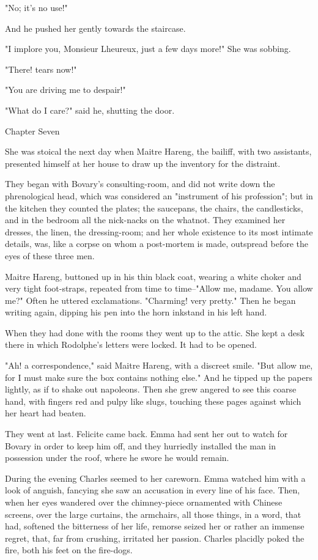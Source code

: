 \documentclass[11pt,twocolumn]{ltugboat}
\begin{document}
"No; it's no use!"

And he pushed her gently towards the staircase.

"I implore you, Monsieur Lheureux, just a few days more!" She was
sobbing.

"There! tears now!"

"You are driving me to despair!"

"What do I care?" said he, shutting the door.



Chapter Seven

She was stoical the next day when Maitre Hareng, the bailiff, with two
assistants, presented himself at her house to draw up the inventory for
the distraint.

They began with Bovary's consulting-room, and did not write down
the phrenological head, which was considered an "instrument of his
profession"; but in the kitchen they counted the plates; the saucepans,
the chairs, the candlesticks, and in the bedroom all the nick-nacks on
the whatnot. They examined her dresses, the linen, the dressing-room;
and her whole existence to its most intimate details, was, like a corpse
on whom a post-mortem is made, outspread before the eyes of these three
men.

Maitre Hareng, buttoned up in his thin black coat, wearing a white
choker and very tight foot-straps, repeated from time to time--"Allow
me, madame. You allow me?" Often he uttered exclamations. "Charming!
very pretty." Then he began writing again, dipping his pen into the horn
inkstand in his left hand.

When they had done with the rooms they went up to the attic. She kept a
desk there in which Rodolphe's letters were locked. It had to be opened.

"Ah! a correspondence," said Maitre Hareng, with a discreet smile. "But
allow me, for I must make sure the box contains nothing else." And he
tipped up the papers lightly, as if to shake out napoleons. Then she
grew angered to see this coarse hand, with fingers red and pulpy like
slugs, touching these pages against which her heart had beaten.

They went at last. Felicite came back. Emma had sent her out to watch
for Bovary in order to keep him off, and they hurriedly installed the
man in possession under the roof, where he swore he would remain.

During the evening Charles seemed to her careworn. Emma watched him with
a look of anguish, fancying she saw an accusation in every line of his
face. Then, when her eyes wandered over the chimney-piece ornamented
with Chinese screens, over the large curtains, the armchairs, all
those things, in a word, that had, softened the bitterness of her life,
remorse seized her or rather an immense regret, that, far from crushing,
irritated her passion. Charles placidly poked the fire, both his feet on
the fire-dogs.
\end{document}
